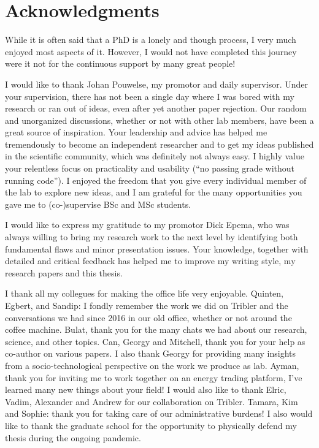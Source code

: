\chapter*{Acknowledgments}

While it is often said that a PhD is a lonely and though process, I very much enjoyed most aspects of it.
However, I would not have completed this journey were it not for the continuous support by many great people!

I would like to thank Johan Pouwelse, my promotor and daily supervisor.
Under your supervision, there has not been a single day where I was bored with my research or ran out of ideas, even after yet another paper rejection.
Our random and unorganized discussions, whether or not with other lab members, have been a great source of inspiration.
Your leadership and advice has helped me tremendously to become an independent researcher and to get my ideas published in the scientific community, which was definitely not always easy.
I highly value your relentless focus on practicality and usability (\enquote{no passing grade without running code}).
I enjoyed the freedom that you give every individual member of the lab to explore new ideas, and I am grateful for the many opportunities you gave me to (co-)supervise BSc and MSc students.

I would like to express my gratitude to my promotor Dick Epema, who was always willing to bring my research work to the next level by identifying both fundamental flaws and minor presentation issues.
Your knowledge, together with detailed and critical feedback has helped me to improve my writing style, my research papers and this thesis.

I thank all my collegues for making the office life very enjoyable.
Quinten, Egbert, and Sandip: I fondly remember the work we did on Tribler and the conversations we had since 2016 in our old office, whether or not around the coffee machine.
Bulat, thank you for the many chats we had about our research, science, and other topics.
Can, Georgy and Mitchell, thank you for your help as co-author on various papers.
I also thank Georgy for providing many insights from a socio-technological perspective on the work we produce as lab.
Ayman, thank you for inviting me to work together on an energy trading platform, I've learned many new things about your field!
I would also like to thank Elric, Vadim, Alexander and Andrew for our collaboration on Tribler.
Tamara, Kim and Sophie: thank you for taking care of our administrative burdens!
I also would like to thank the graduate school for the opportunity to physically defend my thesis during the ongoing pandemic.

